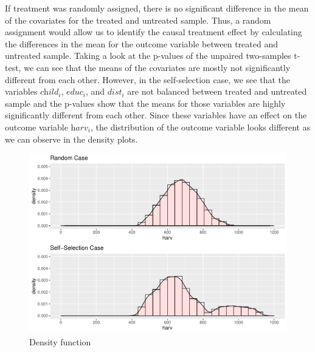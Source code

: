 \begin{enumerate}
If treatment was randomly assigned, there is no significant difference in the mean of the covariates for the treated and untreated sample. Thus, a random assignment would allow us to identify the causal treatment effect by calculating the differences in the mean for the outcome variable between treated and untreated sample. Taking a look at the p-values of the  unpaired two-samples t-test, we can see that the means of the covariates are mostly not significantly different from each other. However, in the self-selection case, we see that the variables $\textit{child}_i$, $\textit{educ}_i$, and $\textit{dist}_i$ are not balanced between treated and untreated sample and the p-values show that the means for those variables are highly significantly different from each other. Since these variables have an effect on the outcome variable $\textit{harv}_i$, the distribution of the outcome variable looks different as we can observe in the density plots.

\begin{figure}[htb]
\begin{raggedleft}
\includegraphics[width=\linewidth]{../figures/density_total.pdf}
\caption{Density function}
\label{fig:density}
\end{raggedleft}
\end{figure}


\end{enumerate}
